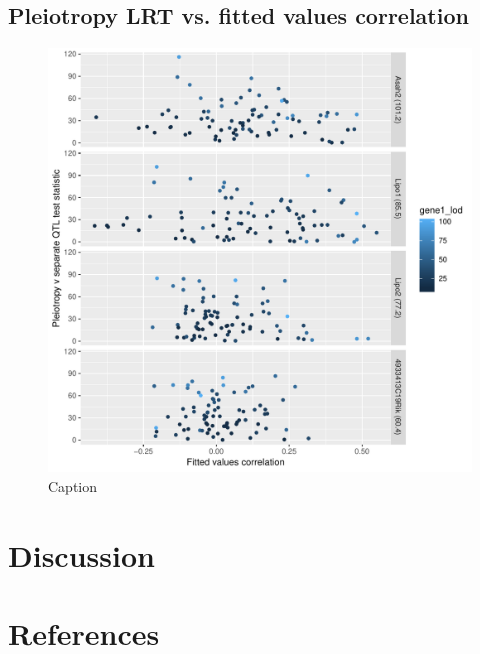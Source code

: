 \documentclass{article}
\begin{document}
\subsection{Pleiotropy LRT vs. fitted values correlation}

\begin{figure}
    \centering
    \includegraphics[width = \textwidth]{../Rmd/lrt-v-corr.pdf}
    \caption{Caption}
    \label{fig:cor}
\end{figure}

\section{Discussion}





\section{References}
\end{document}
